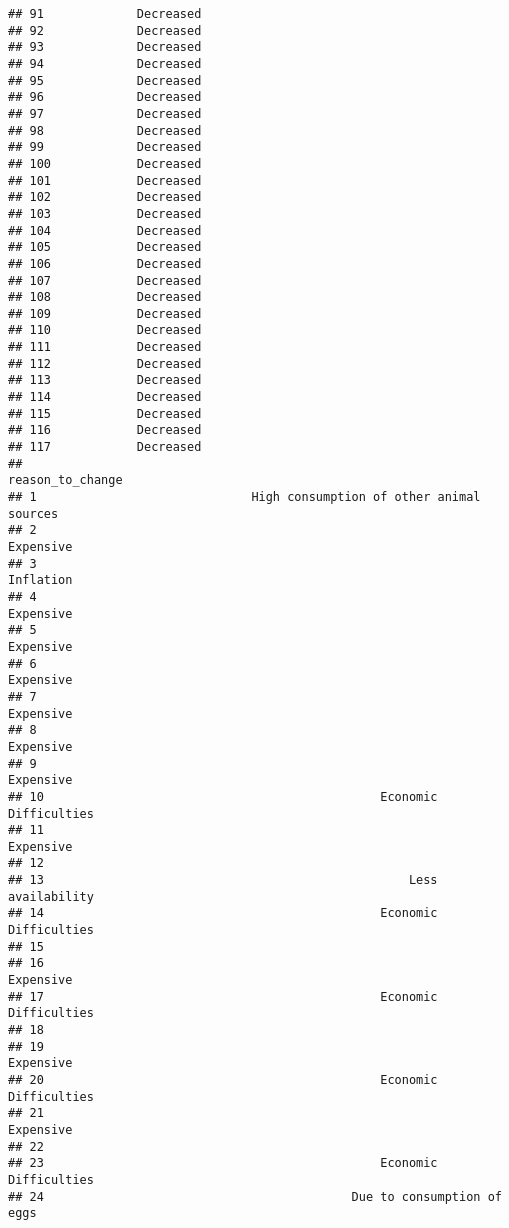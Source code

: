 \documentclass[
]{article}
\begin{document}
\begin{verbatim}
## 91             Decreased
## 92             Decreased
## 93             Decreased
## 94             Decreased
## 95             Decreased
## 96             Decreased
## 97             Decreased
## 98             Decreased
## 99             Decreased
## 100            Decreased
## 101            Decreased
## 102            Decreased
## 103            Decreased
## 104            Decreased
## 105            Decreased
## 106            Decreased
## 107            Decreased
## 108            Decreased
## 109            Decreased
## 110            Decreased
## 111            Decreased
## 112            Decreased
## 113            Decreased
## 114            Decreased
## 115            Decreased
## 116            Decreased
## 117            Decreased
##                                                        reason_to_change
## 1                              High consumption of other animal sources
## 2                                                            Expensive 
## 3                                                            Inflation 
## 4                                                            Expensive 
## 5                                                            Expensive 
## 6                                                            Expensive 
## 7                                                            Expensive 
## 8                                                            Expensive 
## 9                                                            Expensive 
## 10                                               Economic Difficulties 
## 11                                                           Expensive 
## 12                                                                     
## 13                                                   Less availability 
## 14                                               Economic Difficulties 
## 15                                                                     
## 16                                                           Expensive 
## 17                                               Economic Difficulties 
## 18                                                                     
## 19                                                           Expensive 
## 20                                               Economic Difficulties 
## 21                                                           Expensive 
## 22                                                                     
## 23                                               Economic Difficulties 
## 24                                           Due to consumption of eggs

\end{verbatim}
\end{document}
